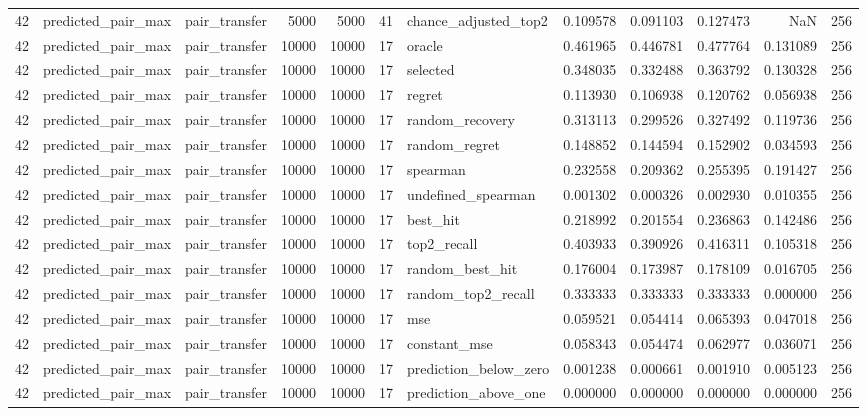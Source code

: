 \begin{tabular}{rllrrrlrrrrr}
42 & predicted_pair_max & pair_transfer & 5000 & 5000 & 41 & chance_adjusted_top2 & 0.109578 & 0.091103 & 0.127473 & NaN & 256 \\
42 & predicted_pair_max & pair_transfer & 10000 & 10000 & 17 & oracle & 0.461965 & 0.446781 & 0.477764 & 0.131089 & 256 \\
42 & predicted_pair_max & pair_transfer & 10000 & 10000 & 17 & selected & 0.348035 & 0.332488 & 0.363792 & 0.130328 & 256 \\
42 & predicted_pair_max & pair_transfer & 10000 & 10000 & 17 & regret & 0.113930 & 0.106938 & 0.120762 & 0.056938 & 256 \\
42 & predicted_pair_max & pair_transfer & 10000 & 10000 & 17 & random_recovery & 0.313113 & 0.299526 & 0.327492 & 0.119736 & 256 \\
42 & predicted_pair_max & pair_transfer & 10000 & 10000 & 17 & random_regret & 0.148852 & 0.144594 & 0.152902 & 0.034593 & 256 \\
42 & predicted_pair_max & pair_transfer & 10000 & 10000 & 17 & spearman & 0.232558 & 0.209362 & 0.255395 & 0.191427 & 256 \\
42 & predicted_pair_max & pair_transfer & 10000 & 10000 & 17 & undefined_spearman & 0.001302 & 0.000326 & 0.002930 & 0.010355 & 256 \\
42 & predicted_pair_max & pair_transfer & 10000 & 10000 & 17 & best_hit & 0.218992 & 0.201554 & 0.236863 & 0.142486 & 256 \\
42 & predicted_pair_max & pair_transfer & 10000 & 10000 & 17 & top2_recall & 0.403933 & 0.390926 & 0.416311 & 0.105318 & 256 \\
42 & predicted_pair_max & pair_transfer & 10000 & 10000 & 17 & random_best_hit & 0.176004 & 0.173987 & 0.178109 & 0.016705 & 256 \\
42 & predicted_pair_max & pair_transfer & 10000 & 10000 & 17 & random_top2_recall & 0.333333 & 0.333333 & 0.333333 & 0.000000 & 256 \\
42 & predicted_pair_max & pair_transfer & 10000 & 10000 & 17 & mse & 0.059521 & 0.054414 & 0.065393 & 0.047018 & 256 \\
42 & predicted_pair_max & pair_transfer & 10000 & 10000 & 17 & constant_mse & 0.058343 & 0.054474 & 0.062977 & 0.036071 & 256 \\
42 & predicted_pair_max & pair_transfer & 10000 & 10000 & 17 & prediction_below_zero & 0.001238 & 0.000661 & 0.001910 & 0.005123 & 256 \\
42 & predicted_pair_max & pair_transfer & 10000 & 10000 & 17 & prediction_above_one & 0.000000 & 0.000000 & 0.000000 & 0.000000 & 256 \\

\end{tabular}
